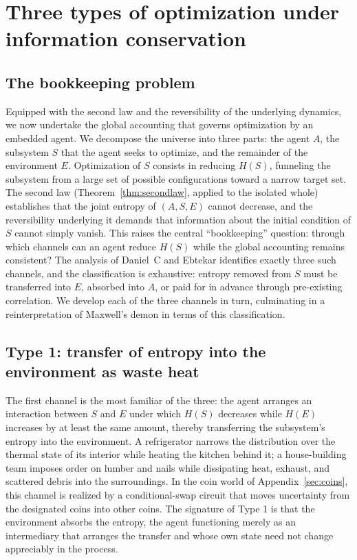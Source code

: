 \documentclass[11pt]{article}
\begin{document}
\section{Three types of optimization under information conservation}
\label{sec:threetypes}

\subsection{The bookkeeping problem}
\label{sec:bookkeeping}

Equipped with the second law and the reversibility of the underlying dynamics, we now undertake the global accounting that governs optimization by an embedded agent. We decompose the universe into three parts: the agent $A$, the subsystem $S$ that the agent seeks to optimize, and the remainder of the environment $E$. Optimization of $S$ consists in reducing $H(S)$, funneling the subsystem from a large set of possible configurations toward a narrow target set. The second law (Theorem~\ref{thm:secondlaw}, applied to the isolated whole) establishes that the joint entropy of $(A, S, E)$ cannot decrease, and the reversibility underlying it demands that information about the initial condition of $S$ cannot simply vanish. This raises the central ``bookkeeping'' question: through which channels can an agent reduce $H(S)$ while the global accounting remains consistent? The analysis of Daniel~C and Ebtekar identifies exactly three such channels, and the classification is exhaustive: entropy removed from $S$ must be transferred into $E$, absorbed into $A$, or paid for in advance through pre-existing correlation. We develop each of the three channels in turn, culminating in a reinterpretation of Maxwell's demon in terms of this classification.

\subsection{Type 1: transfer of entropy into the environment as waste heat}
\label{sec:type1}

The first channel is the most familiar of the three: the agent arranges an interaction between $S$ and $E$ under which $H(S)$ decreases while $H(E)$ increases by at least the same amount, thereby transferring the subsystem's entropy into the environment. A refrigerator narrows the distribution over the thermal state of its interior while heating the kitchen behind it; a house-building team imposes order on lumber and nails while dissipating heat, exhaust, and scattered debris into the surroundings. In the coin world of Appendix~\ref{sec:coins}, this channel is realized by a conditional-swap circuit that moves uncertainty from the designated coins into other coins. The signature of Type 1 is that the environment absorbs the entropy, the agent functioning merely as an intermediary that arranges the transfer and whose own state need not change appreciably in the process.
\end{document}
